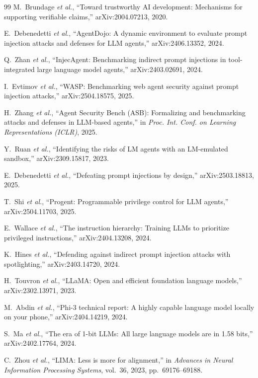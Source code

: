 \documentclass[conference]{IEEEtran}
\begin{document}
\begin{thebibliography}{99}
 M.~Brundage \emph{et al.}, ``Toward trustworthy AI development: Mechanisms for supporting verifiable claims,'' arXiv:2004.07213, 2020.

 E.~Debenedetti \emph{et al.}, ``AgentDojo: A dynamic environment to evaluate prompt injection attacks and defenses for LLM agents,'' arXiv:2406.13352, 2024.

 Q.~Zhan \emph{et al.}, ``InjecAgent: Benchmarking indirect prompt injections in tool-integrated large language model agents,'' arXiv:2403.02691, 2024.

 I.~Evtimov \emph{et al.}, ``WASP: Benchmarking web agent security against prompt injection attacks,'' arXiv:2504.18575, 2025.

 H.~Zhang \emph{et al.}, ``Agent Security Bench (ASB): Formalizing and benchmarking attacks and defenses in LLM-based agents,'' in \emph{Proc. Int. Conf. on Learning Representations (ICLR)}, 2025.

 Y.~Ruan \emph{et al.}, ``Identifying the risks of LM agents with an LM-emulated sandbox,'' arXiv:2309.15817, 2023.

 E.~Debenedetti \emph{et al.}, ``Defeating prompt injections by design,'' arXiv:2503.18813, 2025.

 T.~Shi \emph{et al.}, ``Progent: Programmable privilege control for LLM agents,'' arXiv:2504.11703, 2025.

 E.~Wallace \emph{et al.}, ``The instruction hierarchy: Training LLMs to prioritize privileged instructions,'' arXiv:2404.13208, 2024.

 K.~Hines \emph{et al.}, ``Defending against indirect prompt injection attacks with spotlighting,'' arXiv:2403.14720, 2024.

 H.~Touvron \emph{et al.}, ``LLaMA: Open and efficient foundation language models,'' arXiv:2302.13971, 2023.

 M.~Abdin \emph{et al.}, ``Phi-3 technical report: A highly capable language model locally on your phone,'' arXiv:2404.14219, 2024.

 S.~Ma \emph{et al.}, ``The era of 1-bit LLMs: All large language models are in 1.58 bits,'' arXiv:2402.17764, 2024.

 C.~Zhou \emph{et al.}, ``LIMA: Less is more for alignment,'' in \emph{Advances in Neural Information Processing Systems}, vol.~36, 2023, pp.~69176--69188.


\end{thebibliography}
\end{document}
